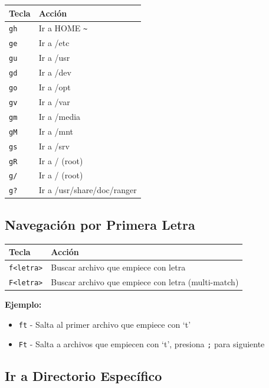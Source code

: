 \documentclass[
  doc,
  floatsintext,
  longtable,
  a4paper,
  nolmodern,
  notxfonts,
  notimes,
  12pt,
  colorlinks=true,linkcolor=blue,citecolor=blue,urlcolor=blue]{apa7}
\providecommand{\tightlist}{%
  \setlength{\itemsep}{0pt}\setlength{\parskip}{0pt}}
\newcounter{none} %
\begin{document}
{\def\LTcaptype{none} %
\begin{longtable}[]{@{}ll@{}}
\toprule\noalign{}
Tecla & Acción \\
\midrule\noalign{}
\endhead
\bottomrule\noalign{}
\endlastfoot
\texttt{gh} & Ir a HOME \texttt{\textasciitilde{}} \\
\texttt{ge} & Ir a /etc \\
\texttt{gu} & Ir a /usr \\
\texttt{gd} & Ir a /dev \\
\texttt{go} & Ir a /opt \\
\texttt{gv} & Ir a /var \\
\texttt{gm} & Ir a /media \\
\texttt{gM} & Ir a /mnt \\
\texttt{gs} & Ir a /srv \\
\texttt{gR} & Ir a / (root) \\
\texttt{g/} & Ir a / (root) \\
\texttt{g?} & Ir a /usr/share/doc/ranger \\
\end{longtable}
}

\subsection{Navegación por Primera
Letra}\label{navegaciuxf3n-por-primera-letra}

{\def\LTcaptype{none} %
\begin{longtable}[]{@{}ll@{}}
\toprule\noalign{}
Tecla & Acción \\
\midrule\noalign{}
\endhead
\bottomrule\noalign{}
\endlastfoot
\texttt{f\textless{}letra\textgreater{}} & Buscar archivo que empiece
con letra \\
\texttt{F\textless{}letra\textgreater{}} & Buscar archivo que empiece
con letra (multi-match) \\
\end{longtable}
}

\textbf{Ejemplo:}

\begin{itemize}
\tightlist
\item
  \texttt{ft} - Salta al primer archivo que empiece con `t'
\item
  \texttt{Ft} - Salta a archivos que empiecen con `t', presiona
  \texttt{;} para siguiente
\end{itemize}

\subsection{Ir a Directorio
Específico}\label{ir-a-directorio-especuxedfico}
\end{document}
